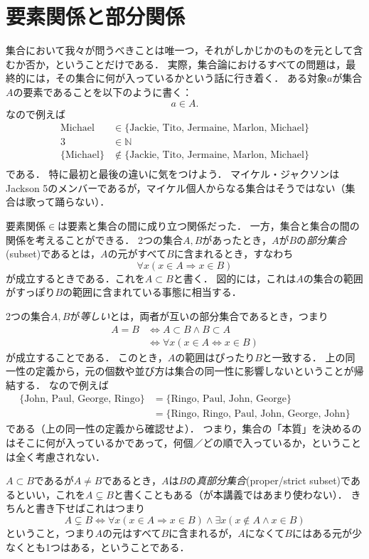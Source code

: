 \documentclass[11pt,a4paper]{jsarticle}
\begin{document}
\section{要素関係と部分関係}
集合において我々が問うべきことは唯一つ，それがしかじかのものを元として含むか否か，ということだけである．
実際，集合論におけるすべての問題は，最終的には，その集合に何が入っているかという話に行き着く．
ある対象$a$が集合$A$の要素であることを以下のように書く：
\[
 a \in A.
\]
なので例えば
\begin{align*}
\text{Michael} &\in \{ \text{Jackie, Tito, Jermaine, Marlon, Michael}\}  \\
3 &\in \mathbb{N} \\
\{ \text{Michael} \} &\not\in \{ \text{Jackie, Tito, Jermaine, Marlon, Michael}\}  \\
\end{align*}
である．
特に最初と最後の違いに気をつけよう．
マイケル・ジャクソンはJackson 5のメンバーであるが，マイケル個人からなる集合はそうではない（集合は歌って踊らない）．

要素関係$\in$は要素と集合の間に成り立つ関係だった．
一方，集合と集合の間の関係を考えることができる．
2つの集合$A, B$があったとき，$A$が$B$の\emph{部分集合}(subset)であるとは，$A$の元がすべて$B$に含まれるとき，すなわち
\[
 \forall x (x \in A \Rightarrow x \in B)
\]
が成立するときである．これを$A \subset B$と書く．
図的には，これは$A$の集合の範囲がすっぽり$B$の範囲に含まれている事態に相当する．

2つの集合$A,B$が\emph{等しい}とは，両者が互いの部分集合であるとき，つまり
\begin{align*}
 A = B &\iff A \subset B \wedge B \subset A \\
&\iff \forall x (x \in A \iff x \in B)
\end{align*}
 が成立することである．
このとき，$A$の範囲はぴったり$B$と一致する．
上の同一性の定義から，{元の個数や並び方は集合の同一性に影響しない}ということが帰結する．
なので例えば
\begin{align*}
 \{\text{John, Paul, George, Ringo}\} 
 &= \{\text{Ringo, Paul, John, George}\} \\
 &= \{\text{Ringo, Ringo, Paul, John, George, John}\}
\end{align*}
である（上の同一性の定義から確認せよ）．
つまり，集合の「本質」を決めるのはそこに何が入っているかであって，何個／どの順で入っているか，ということは全く考慮されない．

$A \subset B$であるが$A \neq B$であるとき，$A$は$B$の\emph{真部分集合}(proper/strict subset)であるといい，これを$A \subsetneq B$と書くこともある（が本講義ではあまり使わない）．
きちんと書き下せばこれはつまり
\[
A \subsetneq B \iff \forall x (x \in A \Rightarrow x \in B) \wedge \exists x (x \not\in A \wedge x \in B)
\]
ということ，つまり$A$の元はすべて$B$に含まれるが，$A$になくて$B$にはある元が少なくとも1つはある，ということである．
\end{document}
